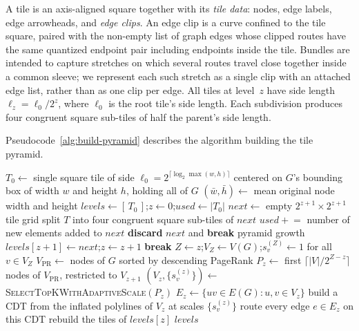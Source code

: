 \documentclass[review]{vgtc}          %
\begin{document}
A tile is an axis-aligned square together with its \emph{tile data}:
nodes, edge labels, edge arrowheads, and \emph{edge clips}. An edge
clip is a curve confined to the tile square, paired with the
non-empty list of graph edges whose clipped routes have the same
quantized endpoint pair including endpoints inside the tile.
Bundles are intended to capture stretches on which
several routes travel close together inside a common sleeve; we
represent each such stretch as a single clip with an attached edge
list, rather than as one clip per edge.
All tiles at level~$z$ have side length $\ell_z=\ell_0/2^z$,
where $\ell_0$ is the root tile's side length. Each subdivision
produces four congruent square sub-tiles of half the parent's side length.

Pseudocode~\ref{alg:build-pyramid} describes the algorithm building
the tile pyramid.
\begin{algorithm}[t]
\caption{\textsc{BuildTilePyramid}$(G, \mathcal{C}, \mathcal{M}_{\max})$}
\label{alg:build-pyramid}
\begin{algorithmic}[1]
\State $T_0 \gets$ single square tile of side $\ell_0=2^{\lceil \log_2 \max(w,h)\rceil}$ centered on $G$'s bounding box of width $w$ and height $h$, holding all of $G$
\State $(\bar w,\bar h) \gets$ mean original node width and height
\State $\mathit{levels} \gets [\,T_0\,]$;\quad $z \gets 0$;\quad $\mathit{used} \gets |T_0|$ 
  \State $\mathit{next} \gets$ empty $2^{z+1}{\times}2^{z+1}$ tile grid
   
    \State split $T$ into four congruent square sub-tiles of $\mathit{next}$ \label{algln:split}
    \State $\mathit{used} \mathrel{+}=$ number of new elements added to $\mathit{next}$
     
      \State \textbf{discard} $\mathit{next}$ and \textbf{break} pyramid growth
    \EndIf
  \EndFor
  \State $\mathit{levels}[z{+}1] \gets \mathit{next}$;\quad $z \gets z + 1$
    \State \textbf{break} 
  \EndIf
\EndWhile
\State $Z \gets z$;\quad $V_Z \gets V(G)$;\quad $s_v^{(Z)} \gets 1$ for all $v\in V_Z$
\State $V_{\mathrm{PR}} \gets$ nodes of $G$ sorted by descending PageRank
  \State $P_z \gets$ first $\lceil |V|/2^{Z-z}\rceil$ nodes of $V_{\mathrm{PR}}$, restricted to $V_{z+1}$
  \State $(V_z, \{s_v^{(z)}\}) \gets$ \textsc{SelectTopKWithAdaptiveScale}$(P_z)$ 
  \State $E_z \gets \{uv\in E(G): u,v\in V_z\}$
  \State build a CDT from the inflated polylines of $V_z$ at scales $\{s_v^{(z)}\}$
  \State route every edge $e\in E_z$ on this CDT
  \State rebuild the tiles of $\mathit{levels}[z]$ \label{algln:rebuild}
\EndFor
\State \Return $\mathit{levels}$
\end{algorithmic}
\end{algorithm}
\end{document}
